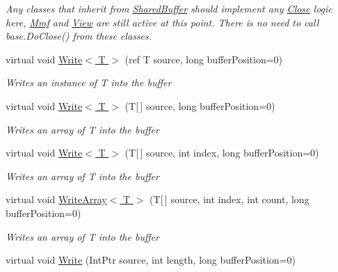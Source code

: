 \begin{DoxyCompactItemize}
\begin{DoxyCompactList}\small\item\em Any classes that inherit from \hyperlink{class_shared_memory_1_1_shared_buffer}{Shared\+Buffer} should implement any \hyperlink{class_shared_memory_1_1_shared_buffer_a137e5d49a530fd990c6d22d30b92250a}{Close} logic here, \hyperlink{class_shared_memory_1_1_shared_buffer_a10466aaf4679f286101dfe69e187ca18}{Mmf} and \hyperlink{class_shared_memory_1_1_shared_buffer_a8ac57fdf6cb9e181d10f4af066f36d41}{View} are still active at this point. There is no need to call base.\+Do\+Close() from these classes. \end{DoxyCompactList}\item 
virtual void \hyperlink{class_shared_memory_1_1_shared_buffer_a82edbe6f30b012bc93f098db46a582ec}{Write$<$ T $>$} (ref T source, long buffer\+Position=0)
\begin{DoxyCompactList}\small\item\em Writes an instance of {\itshape T}  into the buffer \end{DoxyCompactList}\item 
virtual void \hyperlink{class_shared_memory_1_1_shared_buffer_aff9ac6982aca4308738395c9a583d50e}{Write$<$ T $>$} (T\mbox{[}$\,$\mbox{]} source, long buffer\+Position=0)
\begin{DoxyCompactList}\small\item\em Writes an array of {\itshape T}  into the buffer \end{DoxyCompactList}\item 
virtual void \hyperlink{class_shared_memory_1_1_shared_buffer_a70df6df643ac66849ced0ccca5f7c535}{Write$<$ T $>$} (T\mbox{[}$\,$\mbox{]} source, int index, long buffer\+Position=0)
\begin{DoxyCompactList}\small\item\em Writes an array of {\itshape T}  into the buffer \end{DoxyCompactList}\item 
virtual void \hyperlink{class_shared_memory_1_1_shared_buffer_a6a412911425c1d0eade55f96c8ae8b20}{Write\+Array$<$ T $>$} (T\mbox{[}$\,$\mbox{]} source, int index, int count, long buffer\+Position=0)
\begin{DoxyCompactList}\small\item\em Writes an array of {\itshape T}  into the buffer \end{DoxyCompactList}\item 
virtual void \hyperlink{class_shared_memory_1_1_shared_buffer_acbe85aa71eaf1624fa5e03c0b026fa52}{Write} (Int\+Ptr source, int length, long buffer\+Position=0)

\end{DoxyCompactItemize}
